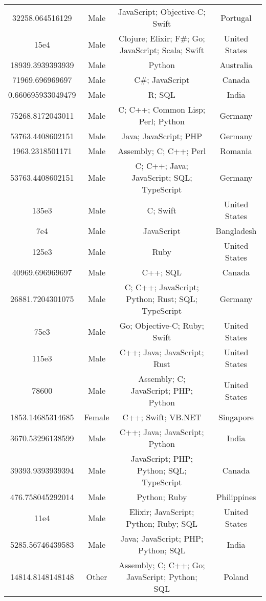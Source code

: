 \begin{center}
\begin{tabular}{ |c|c|c|c| }
32258.064516129  &  Male  &  JavaScript; Objective-C; Swift  &  Portugal  \\ 
15e4  &  Male  &  Clojure; Elixir; F\#; Go; JavaScript; Scala; Swift  &  United States  \\ 
18939.3939393939  &  Male  &  Python  &  Australia  \\ 
71969.696969697  &  Male  &  C\#; JavaScript  &  Canada  \\ 
0.660695933049479  &  Male  &  R; SQL  &  India  \\ 
75268.8172043011  &  Male  &  C; C++; Common Lisp; Perl; Python  &  Germany  \\ 
53763.4408602151  &  Male  &  Java; JavaScript; PHP  &  Germany  \\ 
1963.2318501171  &  Male  &  Assembly; C; C++; Perl  &  Romania  \\ 
53763.4408602151  &  Male  &  C; C++; Java; JavaScript; SQL; TypeScript  &  Germany  \\ 
135e3  &  Male  &  C; Swift  &  United States  \\ 
7e4  &  Male  &  JavaScript  &  Bangladesh  \\ 
125e3  &  Male  &  Ruby  &  United States  \\ 
40969.696969697  &  Male  &  C++; SQL  &  Canada  \\ 
26881.7204301075  &  Male  &  C; C++; JavaScript; Python; Rust; SQL; TypeScript  &  Germany  \\ 
75e3  &  Male  &  Go; Objective-C; Ruby; Swift  &  United States  \\ 
115e3  &  Male  &  C++; Java; JavaScript; Rust  &  United States  \\ 
78600  &  Male  &  Assembly; C; JavaScript; PHP; Python  &  United States  \\ 
1853.14685314685  &  Female  &  C++; Swift; VB.NET  &  Singapore  \\ 
3670.53296138599  &  Male  &  C++; Java; JavaScript; Python  &  India  \\ 
39393.9393939394  &  Male  &  JavaScript; PHP; Python; SQL; TypeScript  &  Canada  \\ 
476.758045292014  &  Male  &  Python; Ruby  &  Philippines  \\ 
11e4  &  Male  &  Elixir; JavaScript; Python; Ruby; SQL  &  United States  \\ 
5285.56746439583  &  Male  &  Java; JavaScript; PHP; Python; SQL  &  India  \\ 
14814.8148148148  &  Other  &  Assembly; C; C++; Go; JavaScript; Python; SQL  &  Poland  \\ 

\end{tabular}
\end{center}
